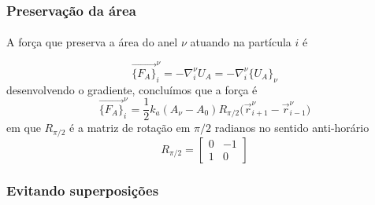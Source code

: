 \documentclass{article}
\theoremstyle{definition}
\def \quantity#1#2#3{\vec{#1}_{#2}^{#3}}
\def \quantitysc#1#2#3{{#1}_{#2}^{#3}}
\begin{document}
\subsubsection{Preservação da área}
\paragraph{}
A força que preserva a área do anel $\nu$ atuando na partícula $i$ é

\[    
\quantity{\{F_A\}}{i}{\nu} = - \quantitysc{\nabla}{i}{\nu}U_A = -\quantitysc{\nabla}{i}{\nu} \{U_A\}_\nu
\]
desenvolvendo o gradiente, concluímos que a força é
\begin{equation}
    \quantity{\{F_A\}}{i}{\nu} = \frac{1}{2}k_a (A_\nu - A_0) R_{\pi/2}\big( \quantity{r}{i+1}{\nu} - \quantity{r}{i-1}{\nu}\big)
\label{eq:force_area}
\end{equation}
em que $R_{\pi/2}$ é a matriz de rotação em $\pi/2$ radianos no sentido anti-horário
\[
    R_{\pi/2} = \begin{bmatrix}
        0 &-1 \\
        1 &0
    \end{bmatrix}
\]

\subsubsection{Evitando superposições}
\end{document}
